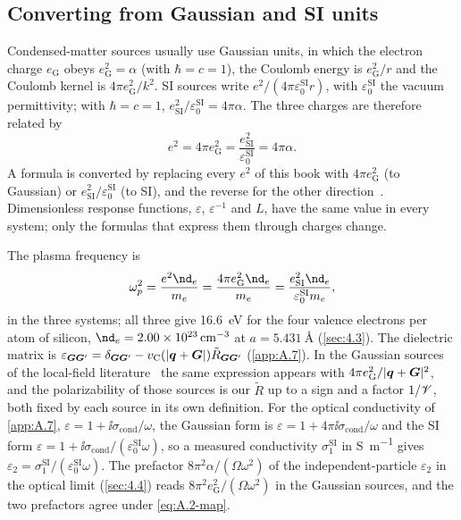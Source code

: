\subsection{Converting from Gaussian and SI units}

Condensed-matter sources usually use Gaussian units, in which the electron charge $e_{\mathrm{G}}$ obeys $e_{\mathrm{G}}^2 = \alpha$ (with $\hbar = c = 1$), the Coulomb energy is $e_{\mathrm{G}}^2/r$ and the Coulomb kernel is $4\pi e_{\mathrm{G}}^2/k^2$. SI sources write $e^2/(4\pi\varepsilon_0^{\mathrm{SI}}r)$, with $\varepsilon_0^{\mathrm{SI}}$ the vacuum permittivity; with $\hbar = c = 1$, $e_{\mathrm{SI}}^2/\varepsilon_0^{\mathrm{SI}} = 4\pi\alpha$. The three charges are therefore related by
\begin{equation}
  e^2 = 4\pi e_{\mathrm{G}}^2 = \frac{e_{\mathrm{SI}}^2}{\varepsilon_0^{\mathrm{SI}}} = 4\pi\alpha .
  \label{eq:A.2-map}
\end{equation}
A formula is converted by replacing every $e^2$ of this book with $4\pi e_{\mathrm{G}}^2$ (to Gaussian) or $e_{\mathrm{SI}}^2/\varepsilon_0^{\mathrm{SI}}$ (to SI), and the reverse for the other direction~\cite[Appendix]{jackson1999classical}. Dimensionless response functions, $\varepsilon$, $\varepsilon^{-1}$ and $L$, have the same value in every system; only the formulas that express them through charges change.

The plasma frequency is
\begin{equation*}
  \omega_p^2 = \frac{e^2\nd_e}{m_e} = \frac{4\pi e_{\mathrm{G}}^2\nd_e}{m_e} = \frac{e_{\mathrm{SI}}^2\nd_e}{\varepsilon_0^{\mathrm{SI}}m_e} ,
\end{equation*}
in the three systems; all three give \SI{16.6}{eV} for the four valence electrons per atom of silicon, $\nd_e = \SI{2.00e23}{cm^{-3}}$ at $a = \SI{5.431}{\angstrom}$ (\cref{sec:4.3}). The dielectric matrix is $\varepsilon_{\bm{G}\bm{G}'} = \delta_{\bm{G}\bm{G}'} - v_{\mathrm{C}}(|\bm{q}+\bm{G}|)\tilde R_{\bm{G}\bm{G}'}$ (\cref{app:A.7}). In the Gaussian sources of the local-field literature~\cite{adler1962quantum,wiser1963dielectric} the same expression appears with $4\pi e_{\mathrm{G}}^2/|\bm{q}+\bm{G}|^2$, and the polarizability of those sources is our $\tilde R$ up to a sign and a factor $1/\mathscr{V}$, both fixed by each source in its own definition. For the optical conductivity of \cref{app:A.7}, $\varepsilon = 1 + \ii\sigma_{\mathrm{cond}}/\omega$, the Gaussian form is $\varepsilon = 1 + 4\pi\ii\sigma_{\mathrm{cond}}/\omega$ and the SI form $\varepsilon = 1 + \ii\sigma_{\mathrm{cond}}/(\varepsilon_0^{\mathrm{SI}}\omega)$, so a measured conductivity $\sigma_1^{\mathrm{SI}}$ in \si{S.m^{-1}} gives $\varepsilon_2 = \sigma_1^{\mathrm{SI}}/(\varepsilon_0^{\mathrm{SI}}\omega)$. The prefactor $8\pi^2\alpha/(\Omega\omega^2)$ of the independent-particle $\varepsilon_2$ in the optical limit (\cref{sec:4.4}) reads $8\pi^2 e_{\mathrm{G}}^2/(\Omega\omega^2)$ in the Gaussian sources, and the two prefactors agree under \cref{eq:A.2-map}.

